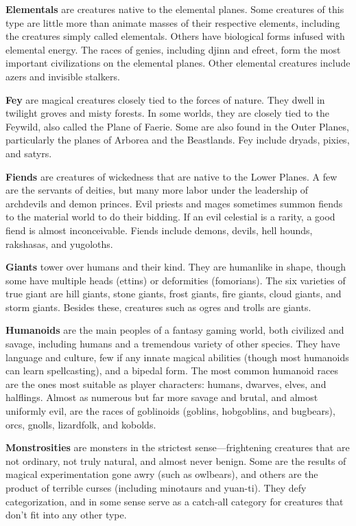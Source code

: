 \documentclass[
]{article}
\begin{document}
\textbf{Elementals} are creatures native to the elemental planes. Some
creatures of this type are little more than animate masses of their
respective elements, including the creatures simply called elementals.
Others have biological forms infused with elemental energy. The races of
genies, including djinn and efreet, form the most important
civilizations on the elemental planes. Other elemental creatures include
azers and invisible stalkers.

\textbf{Fey} are magical creatures closely tied to the forces of nature.
They dwell in twilight groves and misty forests. In some worlds, they
are closely tied to the Feywild, also called the Plane of Faerie. Some
are also found in the Outer Planes, particularly the planes of Arborea
and the Beastlands. Fey include dryads, pixies, and satyrs.

\textbf{Fiends} are creatures of wickedness that are native to the Lower
Planes. A few are the servants of deities, but many more labor under the
leadership of archdevils and demon princes. Evil priests and mages
sometimes summon fiends to the material world to do their bidding. If an
evil celestial is a rarity, a good fiend is almost inconceivable. Fiends
include demons, devils, hell hounds, rakshasas, and yugoloths.

\textbf{Giants} tower over humans and their kind. They are humanlike in
shape, though some have multiple heads (ettins) or deformities
(fomorians). The six varieties of true giant are hill giants, stone
giants, frost giants, fire giants, cloud giants, and storm giants.
Besides these, creatures such as ogres and trolls are giants.

\textbf{Humanoids} are the main peoples of a fantasy gaming world, both
civilized and savage, including humans and a tremendous variety of other
species. They have language and culture, few if any innate magical
abilities (though most humanoids can learn spellcasting), and a bipedal
form. The most common humanoid races are the ones most suitable as
player characters: humans, dwarves, elves, and halflings. Almost as
numerous but far more savage and brutal, and almost uniformly evil, are
the races of goblinoids (goblins, hobgoblins, and bugbears), orcs,
gnolls, lizardfolk, and kobolds.

\textbf{Monstrosities} are monsters in the strictest sense---frightening
creatures that are not ordinary, not truly natural, and almost never
benign. Some are the results of magical experimentation gone awry (such
as owlbears), and others are the product of terrible curses (including
minotaurs and yuan-ti). They defy categorization, and in some sense
serve as a catch-all category for creatures that don't fit into any
other type.
\end{document}
